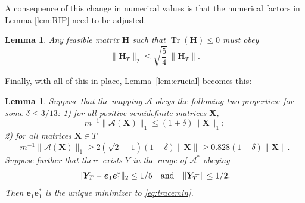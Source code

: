 \documentclass[11pt]{article}
\newtheorem{lemma}[theorem]{Lemma}
\newcommand{\<}{\langle}
\renewcommand{\>}{\rangle}
\newcommand{\bX}{\bm{X}}
\newcommand{\bH}{\bm{H}}
\newcommand{\bY}{\bm{Y}}
\newcommand{\be}{\bm{e}}
\newcommand{\tr}{\operatorname{Tr}}
\numberwithin{equation}{section}
\newcommand{\cA}{\mathcal{A}}
\begin{document}
A consequence of this change in numerical values is that the numerical
factors in Lemma \ref{lem:RIP} need to be adjusted.
\begin{lemma}
  \label{lem:RIPcomplex}
  Any feasible matrix $\bH$ such that $\tr(\bH) \le 0$ must obey
\[
\|\bH_T\|_2 \le \sqrt{\frac{5}{4}} \, \|\bH_T\|.
\]
\end{lemma}

Finally, with all of this in place, Lemma~\ref{lem:crucial} becomes this: 
\begin{lemma}
  \label{lem:crucialcomplex}
  Suppose that the mapping $\cA$ obeys the following two properties:
  for some $\delta \le 3/13$: 1) for all positive semidefinite
  matrices $\bX$,
\begin{equation}
\label{eq:RIP1r1C}
m^{-1} \|\cA(\bX)\|_1 \leq (1+\delta) \|\bX\|_{1};
\end{equation}
2) for all matrices $\bX \in T$
\begin{equation}
\label{eq:RIP1r2C}
m^{-1} \|\cA(\bX)\|_1 \geq 2(\sqrt{2}-1)(1-\delta)\|\bX\| \geq
0.828(1-\delta) \|\bX\|.
\end{equation}
Suppose further that there exists $Y$ in the range of $\cA^*$ obeying
\begin{equation}
  \label{eq:dualcertifC}
  \|\bY_T - \be_1 \be_1^*\|_2 \le 1/5 \quad \text{and} \quad \|\bY_\Tp\| \le 1/2.
\end{equation}
Then $\be_1 \be_1^*$ is the unique minimizer to \eqref{eq:tracemin}.
\end{lemma}
\end{document}
